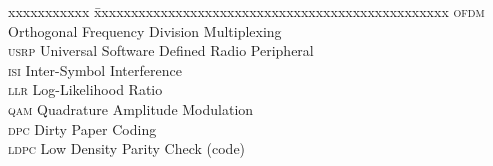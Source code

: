\abbreviations

\noindent
\begin{tabbing}
	xxxxxxxxxxx \= xxxxxxxxxxxxxxxxxxxxxxxxxxxxxxxxxxxxxxxxxxxxxxxx \kill
	\textsc{ofdm} \> Orthogonal Frequency Division Multiplexing \\
	\textsc{usrp} \> Universal Software Defined Radio Peripheral \\
	\textsc{isi}  \> Inter-Symbol Interference \\
	\textsc{llr}  \> Log-Likelihood Ratio \\
	\textsc{qam}  \> Quadrature Amplitude Modulation \\
	\textsc{dpc}  \> Dirty Paper Coding \\
	\textsc{ldpc} \> Low Density Parity Check (code) \\
\end{tabbing}

